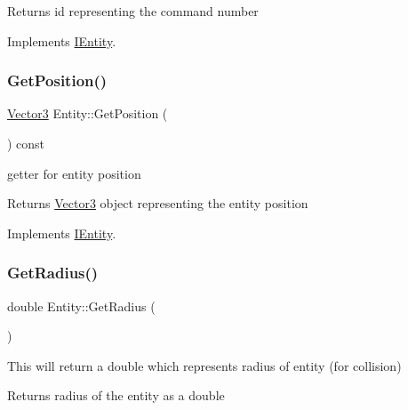 \begin{DoxyReturn}{Returns}
id representing the command number 
\end{DoxyReturn}


Implements \hyperlink{classIEntity_ac3d60cc2fab1ccb61c1be92373e636d9}{I\+Entity}.

\mbox{\label{classEntity_ac6916016f6b9b4b4d18fd988a373fddb}} 
\subsubsection{\texorpdfstring{Get\+Position()}{GetPosition()}}
{\footnotesize\ttfamily \hyperlink{classVector3}{Vector3} Entity\+::\+Get\+Position (\begin{DoxyParamCaption}{ }\end{DoxyParamCaption}) const\hspace{0.3cm}{\ttfamily [virtual]}}



getter for entity position 

\begin{DoxyReturn}{Returns}
\hyperlink{classVector3}{Vector3} object representing the entity position 
\end{DoxyReturn}


Implements \hyperlink{classIEntity_a9bc32587aab91761fc0e718612498199}{I\+Entity}.

\mbox{\label{classEntity_a01b41a1294ffea6e11a897c633a14ef4}} 
\subsubsection{\texorpdfstring{Get\+Radius()}{GetRadius()}}
{\footnotesize\ttfamily double Entity\+::\+Get\+Radius (\begin{DoxyParamCaption}{ }\end{DoxyParamCaption})}



This will return a double which represents radius of entity (for collision) 

\begin{DoxyReturn}{Returns}
radius of the entity as a double 
\end{DoxyReturn}
\mbox{\label{classEntity_a05d8f23908e47ad19e762754461c62e6}} 
